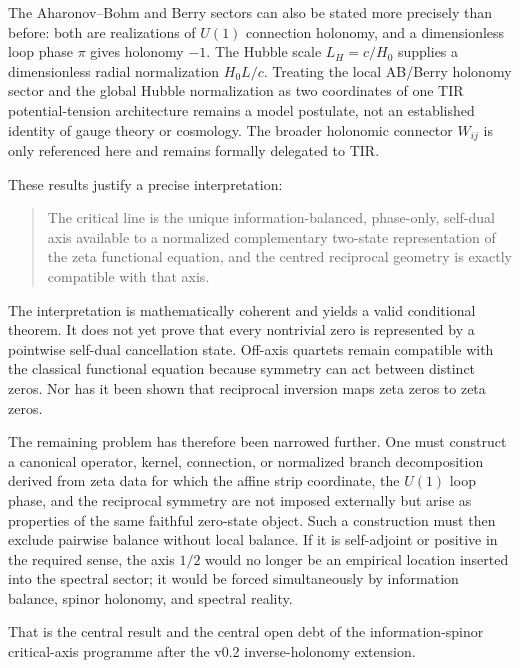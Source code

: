 The Aharonov--Bohm and Berry sectors can also be stated more precisely than before: both are realizations of $U(1)$ connection holonomy, and a dimensionless loop phase $\pi$ gives holonomy $-1$. The Hubble scale $L_H=c/H_0$ supplies a dimensionless radial normalization $H_0L/c$. Treating the local AB/Berry holonomy sector and the global Hubble normalization as two coordinates of one TIR potential-tension architecture remains a model postulate, not an established identity of gauge theory or cosmology. The broader holonomic connector $W_{ij}$ is only referenced here and remains formally delegated to TIR.

These results justify a precise interpretation:
\begin{quote}
The critical line is the unique information-balanced, phase-only, self-dual axis available to a normalized complementary two-state representation of the zeta functional equation, and the centred reciprocal geometry is exactly compatible with that axis.
\end{quote}

The interpretation is mathematically coherent and yields a valid conditional theorem. It does not yet prove that every nontrivial zero is represented by a pointwise self-dual cancellation state. Off-axis quartets remain compatible with the classical functional equation because symmetry can act between distinct zeros. Nor has it been shown that reciprocal inversion maps zeta zeros to zeta zeros.

The remaining problem has therefore been narrowed further. One must construct a canonical operator, kernel, connection, or normalized branch decomposition derived from zeta data for which the affine strip coordinate, the $U(1)$ loop phase, and the reciprocal symmetry are not imposed externally but arise as properties of the same faithful zero-state object. Such a construction must then exclude pairwise balance without local balance. If it is self-adjoint or positive in the required sense, the axis $1/2$ would no longer be an empirical location inserted into the spectral sector; it would be forced simultaneously by information balance, spinor holonomy, and spectral reality.

That is the central result and the central open debt of the information-spinor critical-axis programme after the v0.2 inverse-holonomy extension.
